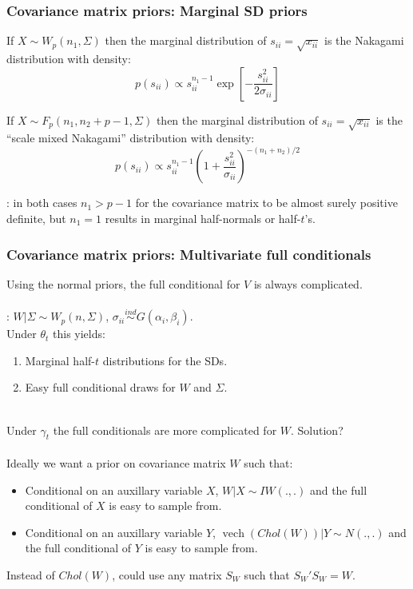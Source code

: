 \documentclass[xcolor=dvipsnames]{beamer}
\DeclareMathOperator{\vech}{vech}
\begin{document}
\begin{frame}
\frametitle{Covariance matrix priors: Marginal SD priors}
If $X\sim W_p(n_1,\Sigma)$ then the marginal distribution of $s_{ii}=\sqrt{x_{ii}}$ is the Nakagami distribution with density:
\[
p(s_{ii})\propto s_{ii}^{n_1-1}\exp\left[-\frac{s_{ii}^2}{2\sigma_{ii}}\right]
\]

\pause If $X\sim F_p(n_1, n_2 + p - 1, \Sigma)$ then the marginal distribution of $s_{ii}=\sqrt{x_{ii}}$ is the ``scale mixed Nakagami'' distribution with density:
\[
p(s_{ii})\propto s_{ii}^{n_1 - 1}\left(1 + \frac{s_{ii}^2}{\sigma_{ii}}\right)^{-(n_1 + n_2)/2}
\]

\pause {\color{blue}{\it The degrees of freedom problem}}: in both cases $n_1 > p - 1$ for the covariance matrix to be almost surely positive definite, but $n_1=1$ results in marginal half-normals or half-$t$'s.
\end{frame}

\begin{frame}
\frametitle{Covariance matrix priors: Multivariate full conditionals}
Using the normal priors, the full conditional for $V$ is always complicated.\\~\\

\pause\citet{huang2013simple}: $W|\Sigma\sim W_p(n,\Sigma)$, $\sigma_{ii}\stackrel{ind}{\sim} G(\alpha_i,\beta_i)$. \\

Under $\theta_t$ this yields:
\begin{enumerate}
\item Marginal half-$t$ distributions for the SDs.
\item Easy full conditional draws for $W$ and $\Sigma$.\\~
\end{enumerate}

\pause Under $\gamma_t$ the full conditionals are more complicated for $W$.  Solution?\\~\\

\pause Ideally we want a prior on covariance matrix $W$ such that:
\begin{itemize}
\item Conditional on an auxillary variable $X$, $W|X \sim IW(.,.)$ and the full conditional of $X$ is easy to sample from.
\item Conditional on an auxillary variable $Y$, $\vech(Chol(W))|Y \sim N(.,.)$ and the full conditional of $Y$ is easy to sample from.
\end{itemize}
\pause Instead of $Chol(W)$, could use any matrix $S_W$ such that $S_W'S_W=W$.
\end{frame}
\end{document}
